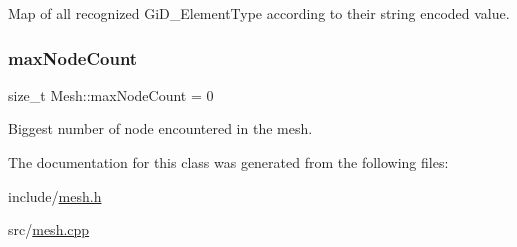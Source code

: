 Map of all recognized Gi\+D\+\_\+\+Element\+Type according to their string encoded value. 

\mbox{\label{classMesh_aba7b72605589dfd0a54bf5fa945774b3}} 
\subsubsection{\texorpdfstring{max\+Node\+Count}{maxNodeCount}}
{\footnotesize\ttfamily size\+\_\+t Mesh\+::max\+Node\+Count = 0\hspace{0.3cm}{\ttfamily [static]}}



Biggest number of node encountered in the mesh. 



The documentation for this class was generated from the following files\+:\begin{DoxyCompactItemize}
\item 
include/\hyperlink{mesh_8h}{mesh.\+h}\item 
src/\hyperlink{mesh_8cpp}{mesh.\+cpp}\end{DoxyCompactItemize}
